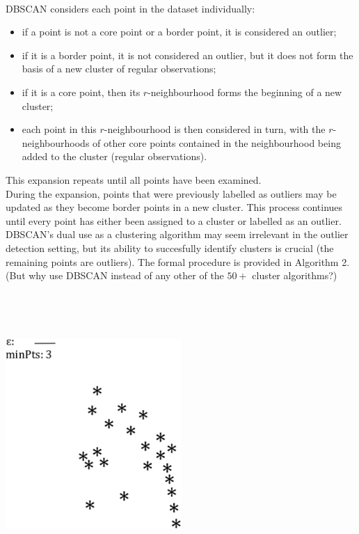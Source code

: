\documentclass[20pt,landscape,footrule,headrule]{foils}
\newcommand{\newl}{\newline\newline}
\begin{document}
{{\newpage\ \\ \noindent DBSCAN considers each point in the dataset individually:
\begin{itemize}
\item if a point is not a core point or a border point, it is considered an outlier;
\item if it is a border point, it is not considered an outlier, but it does not form the basis of a new cluster of regular observations;
\item if it is a core point, then its $r$-neighbourhood forms the beginning of a new cluster;
\item each point in this $r$-neighbourhood is then considered in turn, with the $r$-neighbourhoods of other core points contained in the neighbourhood being added to the cluster (regular observations).
\end{itemize}
This expansion repeats until all points have been examined. \newpage\ \\ \noindent During the expansion, points that were previously labelled as outliers may be updated as they become border points in a new cluster. \newl This process continues until every point has either been assigned to a cluster or labelled as an outlier. \newl DBSCAN's dual use as a clustering algorithm may seem irrelevant in the outlier detection setting, but its ability to succesfully identify clusters is crucial (the remaining points are outliers).
\newl 
The formal procedure is provided in Algorithm 2. \newl (But why use DBSCAN instead of any other  of the $50+$ cluster algorithms?)\newpage\  \begin{center}
\end{center}
\newpage\ \begin{center}
\end{center}

\newpage\ 
\begin{center}
\includegraphics[width=0.5\textwidth]{Images/dbscan1} \\ 
\end{center}

}}
\end{document}
